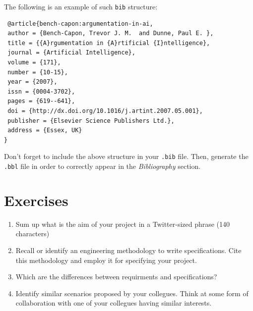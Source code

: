 \documentclass[a4paper,12pt]{report}
\begin{document}
The following is an example of such \texttt{bib} structure:

\begin{verbatim}
 @article{bench-capon:argumentation-in-ai,
 author = {Bench-Capon, Trevor J. M.  and Dunne, Paul E. },
 title = {{A}rgumentation in {A}rtificial {I}ntelligence},
 journal = {Artificial Intelligence},
 volume = {171},
 number = {10-15},
 year = {2007},
 issn = {0004-3702},
 pages = {619--641},
 doi = {http://dx.doi.org/10.1016/j.artint.2007.05.001},
 publisher = {Elsevier Science Publishers Ltd.},
 address = {Essex, UK}
}
\end{verbatim}

Don't forget to include the above structure in your \texttt{.bib} file. 
Then, generate the \texttt{.bbl} file in order to correctly appear in the \textit{Bibliography} section.

\section{Exercises}
\begin{enumerate}
\item Sum up what is the aim of your project in a Twitter-sized phrase (140 characters)
\item Recall or identify an engineering methodology to write specifications. 
 Cite this methodology and employ it for specifying your project.
 \item Which are the differences between requirments and specifications? 
 \item Identify similar scenarios proposed by your collegues. 
 Think at some form of collaboration with one of your collegues having similar interests.
\end{enumerate}

\vspace{0.5cm}

\vspace{0.5cm}

\vspace{0.5cm}
\end{document}
